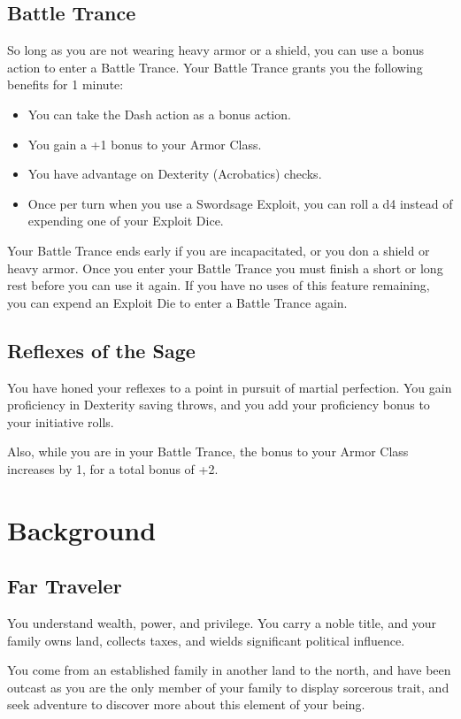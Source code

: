 \documentclass[letterpaper,justified,openany,oneside,twocolumn]{dndbook}
\begin{document}
\subsection*{Battle Trance}
So long as you are not wearing heavy armor or a shield, you can use a bonus action to enter a Battle Trance. Your Battle Trance grants you the following benefits for 1 minute:
\begin{itemize}
    \item You can take the Dash action as a bonus action.
    \item You gain a +1 bonus to your Armor Class.
    \item You have advantage on Dexterity (Acrobatics) checks.
    \item Once per turn when you use a Swordsage Exploit, you can roll a d4 instead of expending one of your Exploit Dice.
\end{itemize}
Your Battle Trance ends early if you are incapacitated, or you don a shield or heavy armor. Once you enter your Battle Trance you must finish a short or long rest before you can use it again. If you have no uses of this feature remaining, you can expend an Exploit Die to enter a Battle Trance again.

\subsection*{Reflexes of the Sage}
You have honed your reflexes to a point in pursuit of martial perfection. You gain proficiency in Dexterity saving throws, and you add your proficiency bonus to your initiative rolls.

Also, while you are in your Battle Trance, the bonus to your Armor Class increases by 1, for a total bonus of +2.

\section*{Background}
\subsection*{Far Traveler}
You understand wealth, power, and privilege. You carry a noble title, and your family owns land, collects taxes, and wields significant political influence.

You come from an established family in another land to the north, and have been outcast as you are the only member of your family to display sorcerous trait, and seek adventure to discover more about this element of your being.
\end{document}
